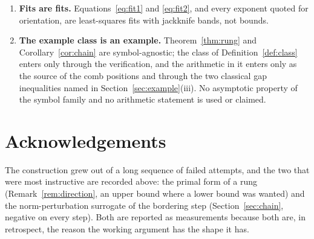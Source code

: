 \documentclass[11pt,a4paper]{article}
\theoremstyle{plain}
\theoremstyle{definition}
\begin{document}
\begin{enumerate}[label=\textup{(L\arabic*)},leftmargin=3.2em]
  Cauchy--Schwarz reduction to the corner mass --- which requires a sign
  hypothesis on the increment sequence and a summed Harnack-type ratio bound. Both
  hold on the windows we measured and neither is proved uniformly; their classical
  address is the corner regularity of inverses of Toeplitz forms with singular symbols
  \cite{Widom1974,FisherHartwig1969,Trench1964} for the ratio, and the discrete
  maximum principle for monotone matrices \cite{Ostrowski1937,Varga1962} for the sign.
  Since that route is logically independent of Theorem~\ref{thm:rung} and
  Corollary~\ref{cor:chain}, which do not use it, we omit it here and defer it to a
  separate note whose subject is a discrete Harnack inequality for the increments of
  the inverse.
\item\label{L:fits} \textbf{Fits are fits.} Equations~\eqref{eq:fit1} and
  \eqref{eq:fit2}, and every exponent quoted for orientation, are least-squares fits
  with jackknife bands, not bounds.
\item\label{L:example} \textbf{The example class is an example.}
  Theorem~\ref{thm:rung} and Corollary~\ref{cor:chain} are symbol-agnostic; the class
  of Definition~\ref{def:class} enters only through the verification, and the
  arithmetic in it enters only as the source of the comb positions and through the two
  classical gap inequalities named in Section~\ref{sec:example}(iii). No asymptotic
  property of the symbol family and no arithmetic statement is used or claimed.
\end{enumerate}

\section*{Acknowledgements}

The construction grew out of a long sequence of failed attempts, and the two that
were most instructive are recorded above: the primal form of a rung
(Remark~\ref{rem:direction}, an upper bound where a lower bound was wanted) and the
norm-perturbation surrogate of the bordering step
(Section~\ref{sec:chain}, negative on every step). Both are reported as measurements
because both are, in retrospect, the reason the working argument has the shape it has.
\end{document}
